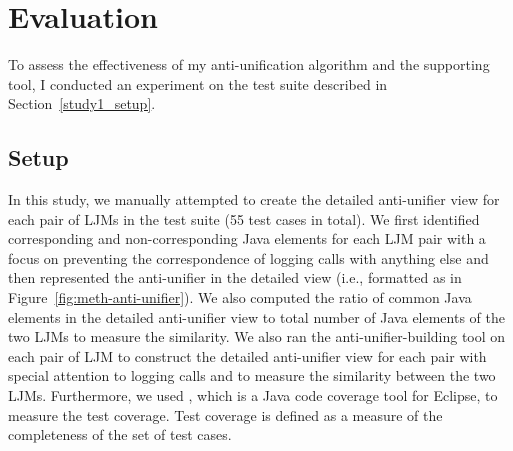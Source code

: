 
\section{Evaluation} \label{anti-unifier-assessment}
To assess the effectiveness of my anti-unification algorithm and the supporting tool, I conducted an experiment on the test suite described in Section~\ref{study1_setup}. %


\subsection{Setup}  \label{study2-setup}
In this study, we manually attempted to create the detailed anti-unifier view for each pair of LJMs in the test suite (55 test cases in total). We first identified corresponding and non-corresponding Java elements for each LJM pair with a focus on preventing the correspondence of logging calls with anything else and then represented the anti-unifier in the detailed view (i.e., formatted as in Figure~\ref{fig:meth-anti-unifier}). We also computed the ratio of common Java elements in the detailed anti-unifier view to total number of Java elements of the two LJMs to measure the similarity.  
We also ran the anti-unifier-building tool on each pair of LJM to construct the detailed anti-unifier view for each pair with special attention to logging calls and to measure the similarity between the two LJMs. Furthermore, we used , which is a Java code coverage tool for Eclipse, to measure the test coverage. Test coverage is defined as a measure of the completeness of the set of test cases. 



